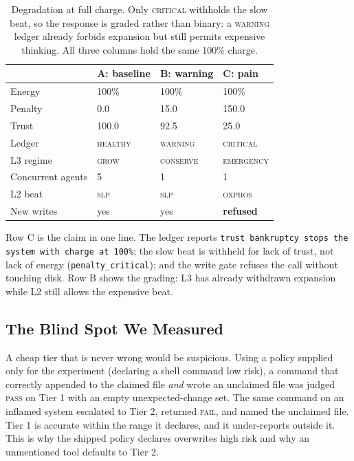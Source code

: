 \documentclass[conference]{IEEEtran}
\begin{document}
\begin{table}[t]
  \centering
  \caption{Degradation at full charge. Only \textsc{critical} withholds the slow
  beat, so the response is graded rather than binary: a \textsc{warning} ledger
  already forbids expansion but still permits expensive thinking. All three
  columns hold the same 100\% charge.}
  \label{tab:degrade}
  \renewcommand{\arraystretch}{1.15}
  \setlength{\tabcolsep}{4pt}
  \begin{tabular}{@{}L{0.21\columnwidth}L{0.22\columnwidth}L{0.22\columnwidth}L{0.22\columnwidth}@{}}
    \toprule
    & \textbf{A: baseline} & \textbf{B: warning} & \textbf{C: pain} \\
    \midrule
    Energy            & 100\% & 100\% & 100\% \\
    Penalty           & 0.0   & 15.0  & 150.0 \\
    Trust             & 100.0 & 92.5  & 25.0 \\
    Ledger            & \textsc{healthy}  & \textsc{warning}  & \textsc{critical} \\
    L3 regime         & \textsc{grow}     & \textsc{conserve} & \textsc{emergency} \\
    Concurrent agents & 5 & 1 & 1 \\
    L2 beat           & \textsc{slp}      & \textsc{slp}      & \textsc{oxphos} \\
    New writes        & yes & yes & \textbf{refused} \\
    \bottomrule
  \end{tabular}
\end{table}

Row C is the claim in one line. The ledger reports
\texttt{trust bankruptcy stops the system with charge at 100\%}; the slow beat is
withheld for lack of trust, not lack of energy
(\texttt{penalty\_critical}); and the write gate refuses the call without
touching disk. Row B shows the grading: L3 has already withdrawn expansion while
L2 still allows the expensive beat.

\subsection{The Blind Spot We Measured}
\label{sec:res-blind}

A cheap tier that is never wrong would be suspicious. Using a policy supplied only
for the experiment (declaring a shell command low risk), a command that correctly
appended to the claimed file \emph{and} wrote an unclaimed file was judged
\textsc{pass} on Tier 1 with an empty unexpected-change set. The same command on
an inflamed system escalated to Tier 2, returned \textsc{fail}, and named the
unclaimed file. Tier 1 is accurate within the range it declares, and it under-reports
outside it. This is why the shipped policy declares overwrites high risk and why
an unmentioned tool defaults to Tier 2.
\end{document}
